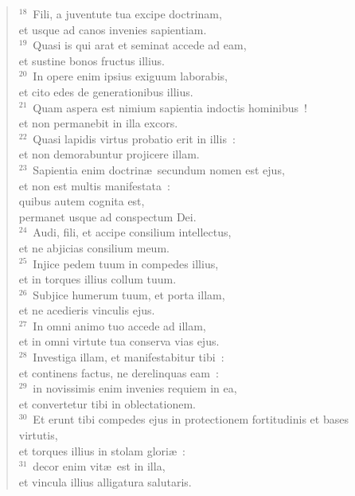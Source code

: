 \begin{flushleft}\begin{verse}${}^{18}$~Fili, a juventute tua excipe doctrinam,\\ et usque ad canos invenies sapientiam.\\
${}^{19}$~Quasi is qui arat et seminat accede ad eam,\\ et sustine bonos fructus illius.\\
${}^{20}$~In opere enim ipsius exiguum laborabis,\\ et cito edes de generationibus illius.\\
${}^{21}$~Quam aspera est nimium sapientia indoctis hominibus~!\\ et non permanebit in illa excors.\\
${}^{22}$~Quasi lapidis virtus probatio erit in illis~:\\ et non demorabuntur projicere illam.\\
${}^{23}$~Sapientia enim doctrin\ae\ secundum nomen est ejus,\\ et non est multis manifestata~:\\ quibus autem cognita est,\\ permanet usque ad conspectum Dei.\\
${}^{24}$~Audi, fili, et accipe consilium intellectus,\\ et ne abjicias consilium meum.\\
${}^{25}$~Injice pedem tuum in compedes illius,\\ et in torques illius collum tuum.\\
${}^{26}$~Subjice humerum tuum, et porta illam,\\ et ne acedieris vinculis ejus.\\
${}^{27}$~In omni animo tuo accede ad illam,\\ et in omni virtute tua conserva vias ejus.\\
${}^{28}$~Investiga illam, et manifestabitur tibi~:\\ et continens factus, ne derelinquas eam~:\\
${}^{29}$~in novissimis enim invenies requiem in ea,\\ et convertetur tibi in oblectationem.\\
${}^{30}$~Et erunt tibi compedes ejus in protectionem fortitudinis et bases virtutis,\\ et torques illius in stolam glori\ae~:\\
${}^{31}$~decor enim vit\ae\ est in illa,\\ et vincula illius alligatura salutaris.\\

\end{verse}
\end{flushleft}
